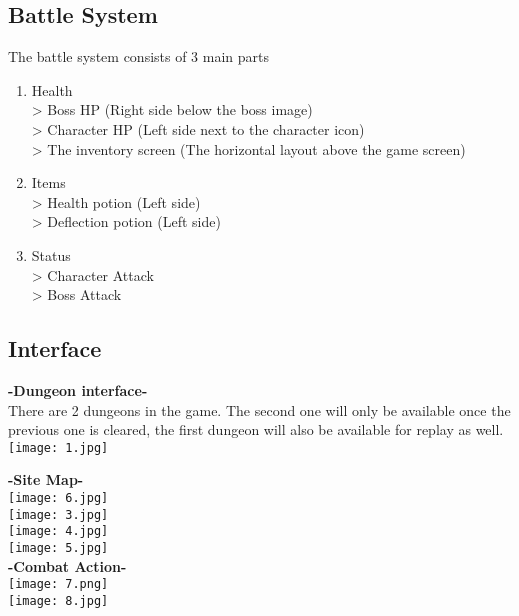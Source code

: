 \documentclass{acm_proc_article-sp}
\begin{document}
\subsection{Battle System}
The battle system consists of 3 main parts
\begin{enumerate}
\item Health \\
	> Boss HP (Right side below the boss image)\\
	> Character HP (Left side next to the character icon)\\
	> The inventory screen (The horizontal layout above the game screen)\\

\item Items \\
	> Health potion (Left side) \\
	> Deflection potion (Left side) \\

\item Status \\
	> Character Attack \\
	> Boss Attack \\

\end{enumerate}

\subsection{Interface}
\textbf{-Dungeon interface-} \\
There are 2 dungeons in the game. The second one will only be available once the previous one is cleared, the first dungeon will also be available for replay as well. \\
\texttt{[image: 1.jpg]}

\textbf{-Site Map-}\\
\texttt{[image: 6.jpg]}\\
\texttt{[image: 3.jpg]}\\
\texttt{[image: 4.jpg]}\\
\texttt{[image: 5.jpg]}\\

\textbf{-Combat Action-}\\
\texttt{[image: 7.png]}\\
\texttt{[image: 8.jpg]}\\
\end{document}
